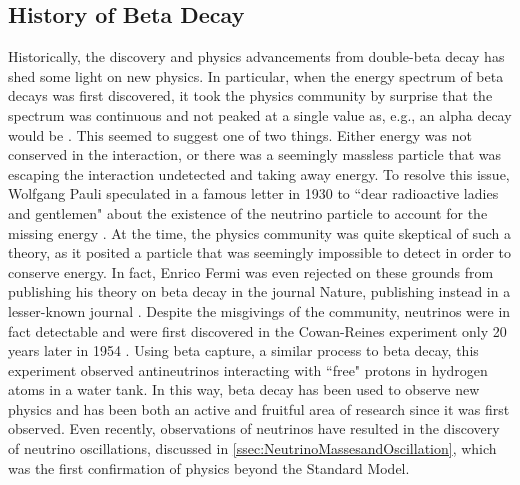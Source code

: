 \subsection{History of Beta Decay}
Historically, the discovery and physics advancements from double-beta decay has shed some light on new physics.
In particular, when the energy spectrum of beta decays was first discovered, it took the physics community by surprise that the spectrum was continuous and not peaked at a single value as, e.g., an alpha decay would be \cite{o.vonbayero.hahnl.meitner}.
This seemed to suggest one of two things. Either energy was not conserved in the interaction, or there was a seemingly massless particle that was escaping the interaction undetected and taking away energy.
To resolve this issue, Wolfgang Pauli speculated in a famous letter in 1930 to ``dear radioactive ladies and gentlemen" about the existence of the neutrino particle to account for the missing energy \cite{pauli_1930}.
At the time, the physics community was quite skeptical of such a theory, as it posited a particle that was seemingly impossible to detect in order to conserve energy.
In fact, Enrico Fermi was even rejected on these grounds from publishing his theory on beta decay in the journal Nature, publishing instead in a lesser-known journal \cite{fermi_1934}.
Despite the misgivings of the community, neutrinos were in fact detectable and were first discovered in the Cowan-Reines experiment only 20 years later in 1954 \cite{PhysRev.92.830}.
Using beta capture, a similar process to beta decay, this experiment observed antineutrinos interacting with ``free" protons in hydrogen atoms in a water tank. 
In this way, beta decay has been used to observe new physics and has been both an active and fruitful area of research since it was first observed.
Even recently, observations of neutrinos have resulted in the discovery of neutrino oscillations, discussed in \autoref{ssec:NeutrinoMassesandOscillation}, which was the first confirmation of physics beyond the Standard Model.
